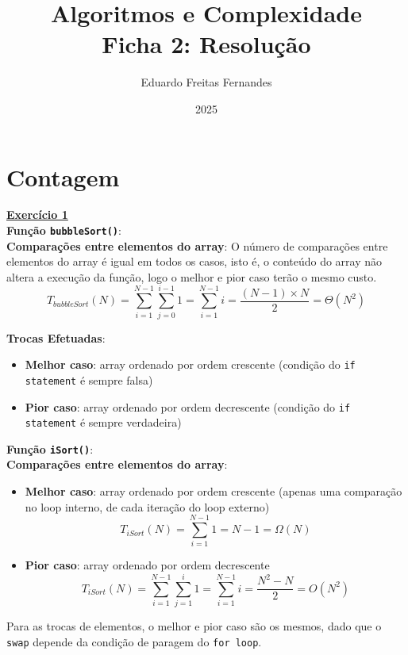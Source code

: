 \documentclass[a4paper,11pt]{article}
\title{Algoritmos e Complexidade\\ Ficha 2: Resolução}
\author{Eduardo Freitas Fernandes}
\date{2025}
\begin{document}
	
	\maketitle
	
	\section{Contagem}
	
	\underline{\textbf{Exercício 1}}\\
	
	\noindent \textbf{Função \texttt{bubbleSort()}}:\\
	
	\noindent \textbf{Comparações entre elementos do array}:
	O número de comparações entre elementos do array é igual em todos os casos, isto é, o conteúdo do array não altera a execução da função, logo o melhor e pior caso terão o mesmo custo.\\
	\[
		T_{bubbleSort}(N) = \sum_{i=1}^{N-1} \sum_{j=0}^{i-1} 1 = \sum_{i=1}^{N-1} i = \frac{(N-1) \times N}{2} = \Theta(N^2)
	\]
	
	\noindent \textbf{Trocas Efetuadas}:
	\begin{itemize}
		\item \textbf{Melhor caso}: array ordenado por ordem crescente (condição do \texttt{if statement} é sempre falsa)
		\item \textbf{Pior caso}: array ordenado por ordem decrescente (condição do \texttt{if statement} é sempre verdadeira)
	\end{itemize}
	
	\noindent \textbf{Função \texttt{iSort()}}:\\
	
	\noindent \textbf{Comparações entre elementos do array}:
	\begin{itemize}
		\item \textbf{Melhor caso}: array ordenado por ordem crescente (apenas uma comparação no loop interno, de cada iteração do loop externo)
		\[ T_{iSort}(N) = \sum_{i=1}^{N-1} 1 = N-1 = \Omega(N) \]
		\item \textbf{Pior caso}: array ordenado por ordem decrescente
		\[ T_{iSort}(N) = \sum_{i=1}^{N-1} \sum_{j=1}^{i} 1 = \sum_{i=1}^{N-1} i = \frac{N^2 - N}{2} = O(N^2) \]
	\end{itemize}
	
	\noindent Para as trocas de elementos, o melhor e pior caso são os mesmos, dado que o \texttt{swap} depende da condição de paragem do \texttt{for loop}.\\
	
\end{document}
